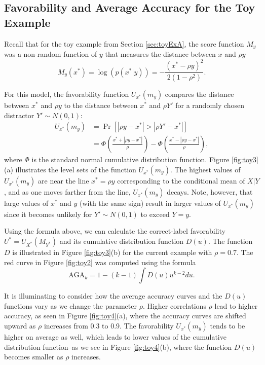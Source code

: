\documentclass[twoside,11pt]{article}
\begin{document}
\subsection{Favorability and Average Accuracy for the Toy Example}

Recall that for the toy example from Section \ref{sec:toyExA}, the
score function $M_{y}$ was a non-random function of $y$ that measures
the distance between $x$ and $\rho y$
\[
M_{y}(x^*) = \log(p(x^*|y)) = -\frac{(x^* - \rho y)^2}{2(1-\rho^2)} .
\]

For this model, the favorability function $U_{x^*}(m_y)$ compares the
distance between $x^*$ and $\rho y$ to the distance between $x^*$ and
$\rho Y'$ for a randomly chosen distractor $ Y'\sim N(0,1)$:
\begin{align*}
U_{x^*}(m_y) &= \Pr[|\rho y - x^*|> |\rho Y' - x^*|] 
\\&= \Phi\left(\frac{x^* + |\rho y - x^*|}{\rho}\right) - \Phi\left(\frac{x^* - |\rho y - x^*|}{\rho}\right),
\end{align*}
where $\Phi$ is the standard normal cumulative distribution function.
Figure \ref{fig:toy3}(a) illustrates the level sets of the function
$U_{x^*}(m_y)$.  The highest values of $U_{x^*}(m_y)$ are near the
line $x^* = \rho y$ corresponding to the conditional mean of $X|Y$, and as
one moves farther from the line, $U_{x^*}(m_y)$ decays.  Note, however,
that large values of $x^*$ and $y$ (with the same sign) result in
larger values of $U_{x^*}(m_y)$ since it becomes unlikely for $Y' \sim
N(0,1)$ to exceed $Y = y$.

Using the formula above, we can calculate the correct-label
favorability $U^* = U_{X^*}(M_{Y^*})$ and its cumulative distribution
function ${D}(u)$.  The function ${D}$ is illustrated in Figure
\ref{fig:toy3}(b) for the current example with $\rho = 0.7$.  The red
curve in Figure \ref{fig:toy2} was computed using the formula
\[
\text{AGA}_k = 1-(k-1) \int {D}(u) u^{k-2} du.
\]

It is illuminating to consider how the average accuracy curves and the
${D}(u)$ functions vary as we change the parameter $\rho$.  Higher
correlations $\rho$ lead to higher accuracy, as seen in Figure
\ref{fig:toy4}(a), where the accuracy curves are shifted upward as
$\rho$ increases from 0.3 to 0.9.  The favorability $U_{x^*}(m_y)$
tends to be higher on average as well, which leads to lower values of
the cumulative distribution function--as we see in Figure
\ref{fig:toy4}(b), where the function ${D}(u)$ becomes smaller as
$\rho$ increases.
\end{document}

